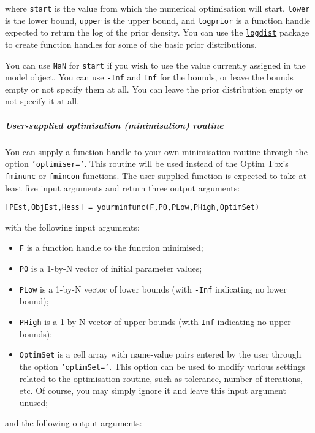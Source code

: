 where \texttt{start} is the value from which the numerical optimisation
will start, \texttt{lower} is the lower bound, \texttt{upper} is the
upper bound, and \texttt{logprior} is a function handle expected to
return the log of the prior density. You can use the
\href{logdist/Contents}{\texttt{logdist}} package to create function
handles for some of the basic prior distributions.

You can use \texttt{NaN} for \texttt{start} if you wish to use the value
currently assigned in the model object. You can use \texttt{-Inf} and
\texttt{Inf} for the bounds, or leave the bounds empty or not specify
them at all. You can leave the prior distribution empty or not specify
it at all.

\subparagraph{User-supplied optimisation (minimisation)
routine}

You can supply a function handle to your own minimisation routine
through the option \texttt{'optimiser='}. This routine will be used
instead of the Optim Tbx's \texttt{fminunc} or \texttt{fmincon}
functions. The user-supplied function is expected to take at least five
input arguments and return three output arguments:

\begin{verbatim}
[PEst,ObjEst,Hess] = yourminfunc(F,P0,PLow,PHigh,OptimSet)
\end{verbatim}

with the following input arguments:

\begin{itemize}
\itemsep1pt\parskip0pt
\item
  \texttt{F} is a function handle to the function minimised;
\item
  \texttt{P0} is a 1-by-N vector of initial parameter values;
\item
  \texttt{PLow} is a 1-by-N vector of lower bounds (with \texttt{-Inf}
  indicating no lower bound);
\item
  \texttt{PHigh} is a 1-by-N vector of upper bounds (with \texttt{Inf}
  indicating no upper bounds);
\item
  \texttt{OptimSet} is a cell array with name-value pairs entered by the
  user through the option \texttt{'optimSet='}. This option can be used
  to modify various settings related to the optimisation routine, such
  as tolerance, number of iterations, etc. Of course, you may simply
  ignore it and leave this input argument unused;
\end{itemize}

and the following output arguments:

